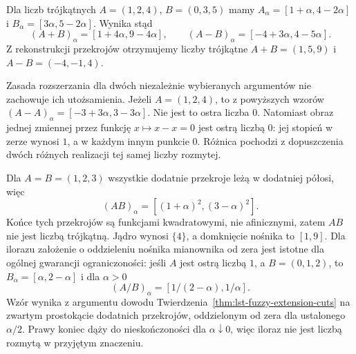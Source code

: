 \begin{przyklad}
\label{ex:lst-fuzzy-triangular-arithmetic}
Dla liczb trójkątnych $A=(1,2,4)$, $B=(0,3,5)$
mamy $A_\alpha=[1+\alpha,4-2\alpha]$ i
$B_\alpha=[3\alpha,5-2\alpha]$.
Wynika stąd
\[
 (A+B)_\alpha=[1+4\alpha,9-4\alpha],
 \qquad
 (A-B)_\alpha=[-4+3\alpha,4-5\alpha].
\]
Z rekonstrukcji przekrojów otrzymujemy liczby trójkątne
$A+B=(1,5,9)$ i $A-B=(-4,-1,4)$.
\begin{center}
\end{center}
\end{przyklad}

\begin{uwaga}\label{rem:lst-fuzzy-dependent-arguments}
Zasada rozszerzania dla dwóch niezależnie wybieranych
argumentów nie zachowuje ich utożsamienia.
Jeżeli $A=(1,2,4)$, to z powyższych wzorów
$(A-A)_\alpha=[-3+3\alpha,3-3\alpha]$.
Nie jest to ostra liczba $0$. Natomiast obraz jednej
zmiennej przez funkcję $x\mapsto x-x=0$ jest ostrą
liczbą $0$: jej stopień w zerze wynosi $1$, a w każdym
innym punkcie $0$. Różnica pochodzi z dopuszczenia
dwóch różnych realizacji tej samej liczby rozmytej.
\end{uwaga}



\begin{przyklad}
\label{ex:ncl-triangular-product}
Dla $A=B=(1,2,3)$ wszystkie dodatnie przekroje
leżą w dodatniej półosi, więc
\[
 (AB)_\alpha=[(1+\alpha)^2,(3-\alpha)^2].
\]
Końce tych przekrojów są funkcjami kwadratowymi,
nie afinicznymi, zatem $AB$ nie jest liczbą
trójkątną. Jądro wynosi $\{4\}$, a domknięcie
nośnika to $[1,9]$. Dla ilorazu założenie o
oddzieleniu nośnika mianownika od zera jest
istotne dla ogólnej gwarancji ograniczoności:
jeśli $A$ jest ostrą liczbą $1$, a $B=(0,1,2)$,
to $B_\alpha=[\alpha,2-\alpha]$ i dla $\alpha>0$
\[
 (A/B)_\alpha=[1/(2-\alpha),1/\alpha].
\]
Wzór wynika z argumentu dowodu
Twierdzenia~\ref{thm:lst-fuzzy-extension-cuts}
na zwartym prostokącie dodatnich przekrojów,
oddzielonym od zera dla ustalonego $\alpha/2$.
Prawy koniec dąży do nieskończoności dla
$\alpha\downarrow0$, więc iloraz nie jest liczbą
rozmytą w przyjętym znaczeniu.
\end{przyklad}

